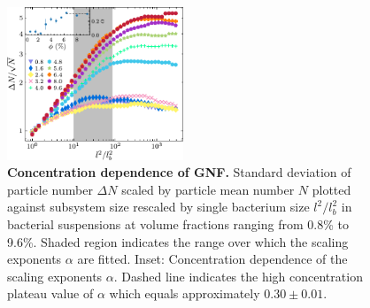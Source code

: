 \documentclass[twocolumn,aps,prl,amsmath,amssymb,longbibliography]{revtex4-2}
\begin{document}
\begin{figure}[ht]
\begin{center}
\includegraphics[width=0.47\textwidth]{figures/GNF/v3.pdf}
\caption[Concentration dependence of GNF.]
{
\textbf{Concentration dependence of GNF.}
Standard deviation of particle number $\Delta N$ scaled by particle mean number $N$ plotted against subsystem size rescaled by single bacterium size $l^2/l_b^2$ in bacterial suspensions at volume fractions ranging from 0.8\% to 9.6\%. Shaded region indicates the range over which the scaling exponents $\alpha$ are fitted.
Inset: Concentration dependence of the scaling exponents $\alpha$. Dashed line indicates the high concentration plateau value of $\alpha$ which equals approximately $0.30 \pm 0.01$.
}
\label{fig:GNF}
\end{center}
\end{figure}
\end{document}
